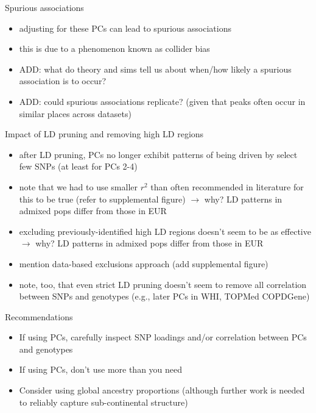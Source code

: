 \documentclass[12pt]{article}
\begin{document}
\noindent Spurious associations
\begin{itemize}
\item adjusting for these PCs can lead to spurious associations
\item this is due to a phenomenon known as collider bias
\item ADD: what do theory and sims tell us about when/how likely a spurious association is to occur?
\item ADD: could spurious associations replicate? (given that peaks often occur in similar places across datasets)
\end{itemize}

\noindent Impact of LD pruning and removing high LD regions
\begin{itemize}
\item after LD pruning, PCs no longer exhibit patterns of being driven by select few SNPs (at least for PCs 2-4)
\item note that we had to use smaller $r^2$ than often recommended in literature for this to be true (refer to supplemental figure) $\rightarrow$ why? LD patterns in admixed pops differ from those in EUR 
\item excluding previously-identified high LD regions doesn't seem to be as effective $\rightarrow$ why? LD patterns in admixed pops differ from those in EUR
\item mention data-based exclusions approach (add supplemental figure)
\item note, too, that even strict LD pruning doesn't seem to remove all correlation between SNPs and genotypes (e.g., later PCs in WHI, TOPMed COPDGene)
\end{itemize}

\noindent Recommendations
\begin{itemize}
\item If using PCs, carefully inspect SNP loadings and/or correlation between PCs and genotypes
\item If using PCs, don't use more than you need
\item Consider using global ancestry proportions (although further work is needed to reliably capture sub-continental structure)
\end{itemize}

\end{document}
